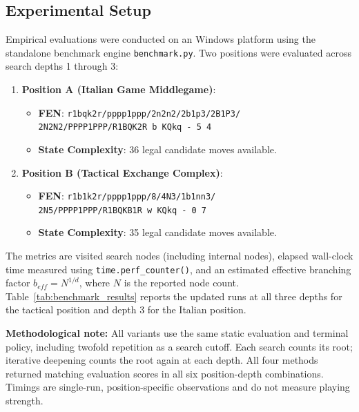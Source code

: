 \documentclass[11pt,a4paper]{article}
\begin{document}
\subsection{Experimental Setup}
Empirical evaluations were conducted on an Windows platform using the standalone benchmark engine \texttt{benchmark.py}. Two positions were evaluated across search depths 1 through 3:
\begin{enumerate}[leftmargin=*]
    \item \textbf{Position A (Italian Game Middlegame)}:
    \begin{itemize}[leftmargin=1.5em]
        \item \textbf{FEN}: \texttt{r1bqk2r/pppp1ppp/2n2n2/2b1p3/2B1P3/} \\
              \hspace*{0.9cm}\texttt{2N2N2/PPPP1PPP/R1BQK2R b KQkq - 5 4}
        \item \textbf{State Complexity}: 36 legal candidate moves available.
    \end{itemize}
    \item \textbf{Position B (Tactical Exchange Complex)}:
    \begin{itemize}[leftmargin=1.5em]
        \item \textbf{FEN}: \texttt{r1b1k2r/pppp1ppp/8/4N3/1b1nn3/} \\
              \hspace*{0.9cm}\texttt{2N5/PPPP1PPP/R1BQKB1R w KQkq - 0 7}
        \item \textbf{State Complexity}: 35 legal candidate moves available.
    \end{itemize}
\end{enumerate}
The metrics are visited search nodes (including internal nodes), elapsed wall-clock time measured using \texttt{time.perf\_counter()}, and an estimated effective branching factor $b_{eff}=N^{1/d}$, where $N$ is the reported node count. Table~\ref{tab:benchmark_results} reports the updated runs at all three depths for the tactical position and depth 3 for the Italian position.

\noindent\textbf{Methodological note:} All variants use the same static evaluation and terminal policy, including twofold repetition as a search cutoff. Each search counts its root; iterative deepening counts the root again at each depth. All four methods returned matching evaluation scores in all six position-depth combinations. Timings are single-run, position-specific observations and do not measure playing strength.
\end{document}
